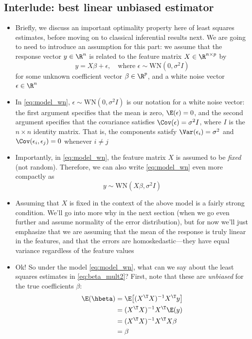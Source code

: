 \documentclass{article}
\begin{document}
\subsection{Interlude: best linear unbiased estimator}

\def\WN{\mathrm{WN}}
\def\MSE{\mathrm{MSE}}

\begin{itemize}
\item Briefly, we discuss an important optimality property here of least squares
  estimates, before moving on to classical inferential results next. We are
  going to need to introduce an assumption for this part: we assume that the
  response vector $y \in \R^n$ is related to the feature matrix $X \in \R^{n
    \times p}$ by
  \begin{equation}
  \label{eq:model_wn}
  y = X \beta + \epsilon, \quad \text{where $\epsilon \sim \WN(0, \sigma^2 I)$}   
  \end{equation}
  for some unknown coefficient vector $\beta \in \R^p$, and a white noise vector 
  $\epsilon \in \R^n$

\item In \eqref{eq:model_wn}, $\epsilon \sim \WN(0, \sigma^2 I)$ is our notation
  for a white noise vector: the first argument specifies that the mean is zero, 
  $\E(\epsilon) = 0$, and the second argument specifies that the covariance
  satisfies $\Cov(\epsilon) = \sigma^2 I$, where $I$ is the $n \times n$
  identity matrix. That is, the components satisfy $\Var(\epsilon_i) = \sigma^2$
  and $\Cov(\epsilon_i, \epsilon_j) = 0$ whenever $i \not= j$

\item Importantly, in \eqref{eq:model_wn}, the feature matrix $X$ is assumed to
  be \emph{fixed} (not random). Therefore, we can also write \eqref{eq:model_wn}
  even more compactly as 
  \[
  y \sim \WN(X \beta, \sigma^2 I)
  \]

\item Assuming that $X$ is fixed in the context of the above model is a fairly
  strong condition. We'll go into more why in the next section (when we go even 
  further and assume normality of the error distribution), but for now we'll
  just emphasize that we are assuming that the mean of the response is truly
  linear in the features, and that the errors are homoskedastic---they have
  equal variance regardless of the feature values 

\item Ok! So under the model \eqref{eq:model_wn}, what can we say about the
  least squares estimates in \eqref{eq:beta_mult2}? First, note that these are 
  \emph{unbiased} for the true coefficients $\beta$:
  \begin{align*}
  \E(\hbeta) &= \E \big[ (X^\T X)^{-1} X^\T y \big] \\
  &= (X^\T X)^{-1} X^\T \E(y) \\
  &= (X^\T X)^{-1} X^\T X \beta \\
  &= \beta
  \end{align*}


\end{itemize}
\end{document}
